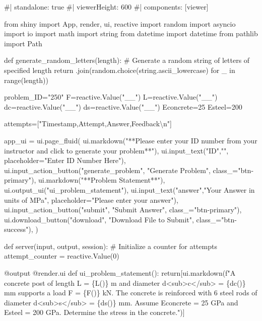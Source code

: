 \documentclass[
  letterpaper,
  DIV=11,
  numbers=noendperiod]{scrreprt}
\newenvironment{Shaded}{\begin{snugshade}}{\end{snugshade}}
\newcommand{\NormalTok}[1]{\textcolor[rgb]{0.00,0.23,0.31}{#1}}
\begin{document}
\begin{Shaded}
\begin{Highlighting}[]
\NormalTok{\#| standalone: true}
\NormalTok{\#| viewerHeight: 600}
\NormalTok{\#| components: [viewer]}

\NormalTok{from shiny import App, render, ui, reactive}
\NormalTok{import random}
\NormalTok{import asyncio}
\NormalTok{import io}
\NormalTok{import math}
\NormalTok{import string}
\NormalTok{from datetime import datetime}
\NormalTok{from pathlib import Path}

\NormalTok{def generate\_random\_letters(length):}
\NormalTok{    \# Generate a random string of letters of specified length}
\NormalTok{    return \textquotesingle{}\textquotesingle{}.join(random.choice(string.ascii\_lowercase) for \_ in range(length)) }

\NormalTok{problem\_ID="250"}
\NormalTok{F=reactive.Value("\_\_")}
\NormalTok{L=reactive.Value("\_\_")}
\NormalTok{dc=reactive.Value("\_\_")}
\NormalTok{ds=reactive.Value("\_\_")}
\NormalTok{Econcrete=25}
\NormalTok{Esteel=200}

\NormalTok{attempts=["Timestamp,Attempt,Answer,Feedback\textbackslash{}n"]}

\NormalTok{app\_ui = ui.page\_fluid(}
\NormalTok{    ui.markdown("**Please enter your ID number from your instructor and click to generate your problem**"),}
\NormalTok{    ui.input\_text("ID","", placeholder="Enter ID Number Here"),}
\NormalTok{    ui.input\_action\_button("generate\_problem", "Generate Problem", class\_="btn{-}primary"),}
\NormalTok{    ui.markdown("**Problem Statement**"),}
\NormalTok{    ui.output\_ui("ui\_problem\_statement"),}
\NormalTok{    ui.input\_text("answer","Your Answer in units of MPa", placeholder="Please enter your answer"),}
\NormalTok{    ui.input\_action\_button("submit", "Submit Answer", class\_="btn{-}primary"),}
\NormalTok{    ui.download\_button("download", "Download File to Submit", class\_="btn{-}success"),}
\NormalTok{)}


\NormalTok{def server(input, output, session):}
\NormalTok{    \# Initialize a counter for attempts}
\NormalTok{    attempt\_counter = reactive.Value(0)}

\NormalTok{    @output}
\NormalTok{    @render.ui}
\NormalTok{    def ui\_problem\_statement():}
\NormalTok{        return[ui.markdown(f"A concrete post of length L = \{L()\}  m and diameter d\textless{}sub\textgreater{}c\textless{}/sub\textgreater{} = \{dc()\} mm supports a load F = \{F()\} kN. The concrete is reinforced with 6 steel rods of diameter d\textless{}sub\textgreater{}s\textless{}/sub\textgreater{} = \{ds()\} mm. Assume Econcrete = 25 GPa and Esteel = 200 GPa. Determine the stress in the concrete.")]}
    

\end{Highlighting}
\end{Shaded}
\end{document}
